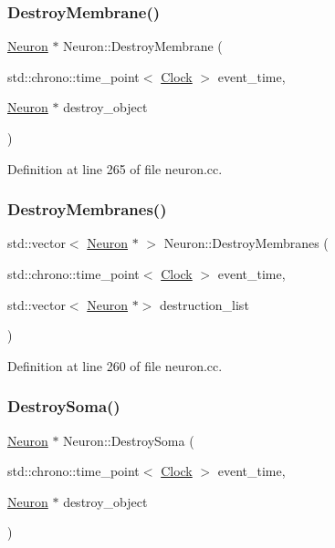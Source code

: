 \subsubsection{\texorpdfstring{Destroy\+Membrane()}{DestroyMembrane()}}
{\footnotesize\ttfamily \mbox{\hyperlink{class_neuron}{Neuron}} $\ast$ Neuron\+::\+Destroy\+Membrane (\begin{DoxyParamCaption}\item[{std\+::chrono\+::time\+\_\+point$<$ \mbox{\hyperlink{universe_8h_a0ef8d951d1ca5ab3cfaf7ab4c7a6fd80}{Clock}} $>$}]{event\+\_\+time,  }\item[{\mbox{\hyperlink{class_neuron}{Neuron}} $\ast$}]{destroy\+\_\+object }\end{DoxyParamCaption})}



Definition at line 265 of file neuron.\+cc.

\mbox{\label{class_neuron_ab77feff95ed7127400a4e02648641ff7}} 
\subsubsection{\texorpdfstring{Destroy\+Membranes()}{DestroyMembranes()}}
{\footnotesize\ttfamily std\+::vector$<$ \mbox{\hyperlink{class_neuron}{Neuron}} $\ast$ $>$ Neuron\+::\+Destroy\+Membranes (\begin{DoxyParamCaption}\item[{std\+::chrono\+::time\+\_\+point$<$ \mbox{\hyperlink{universe_8h_a0ef8d951d1ca5ab3cfaf7ab4c7a6fd80}{Clock}} $>$}]{event\+\_\+time,  }\item[{std\+::vector$<$ \mbox{\hyperlink{class_neuron}{Neuron}} $\ast$$>$}]{destruction\+\_\+list }\end{DoxyParamCaption})}



Definition at line 260 of file neuron.\+cc.

\mbox{\label{class_neuron_a6ff7510f73e29c31003b016bdcb4a70e}} 
\subsubsection{\texorpdfstring{Destroy\+Soma()}{DestroySoma()}}
{\footnotesize\ttfamily \mbox{\hyperlink{class_neuron}{Neuron}} $\ast$ Neuron\+::\+Destroy\+Soma (\begin{DoxyParamCaption}\item[{std\+::chrono\+::time\+\_\+point$<$ \mbox{\hyperlink{universe_8h_a0ef8d951d1ca5ab3cfaf7ab4c7a6fd80}{Clock}} $>$}]{event\+\_\+time,  }\item[{\mbox{\hyperlink{class_neuron}{Neuron}} $\ast$}]{destroy\+\_\+object }\end{DoxyParamCaption})}




